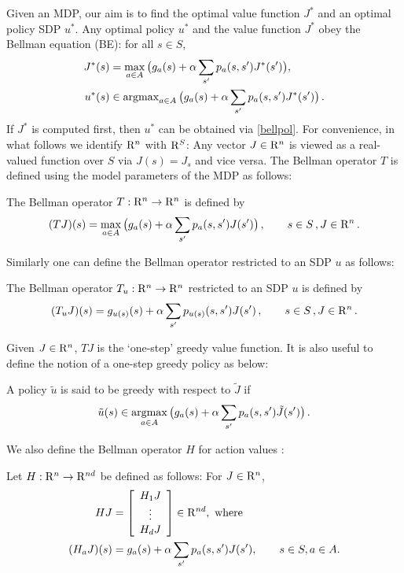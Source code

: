 Given an MDP, our aim is to find the optimal value function $J^*$ and an optimal policy SDP $u^*$. 
Any optimal policy $u^*$ and the value function $J^*$ obey the Bellman equation (BE): for all $ s \in S$, 
\begin{subequations}\label{bell}
\begin{align}
\label{bellval}J^*(s)&=\max_{ a\in A}\big(g_a(s)+\alpha \sum_{s'}p_a(s,s')J^*(s')\big),\\
\label{bellpol}u^*(s)&\in \argmax_{ a\in A}\big(g_a(s)+\alpha \sum_{s'}p_a(s,s')J^*(s')\big)\,.
\end{align}
\end{subequations}
If $J^*$ is computed first, then $u^*$ can be obtained via \eqref{bellpol}. 
For convenience, in what follows we identify $\mathrm{R}^n$ with $\mathrm{R}^{S}$:
Any vector $J\in \mathrm{R}^n$ is viewed as a real-valued function over $S$ via $J(s) = J_s$ and vice versa.
The Bellman operator $T$ is defined using the model parameters of the MDP as follows:
\begin{definition}
The Bellman operator $T: \mathrm{R}^n \to \mathrm{R}^n$ is defined by 
\begin{align}
(TJ)(s)=\max_{a \in A}\big(g_a(s)+\alpha \sum_{s'} p_a(s,s')J(s')\big)\,,  \qquad s\in S\,,J\in \mathrm{R}^n\,.
\end{align}
\end{definition}
Similarly one can define the Bellman operator restricted to an SDP $u$ as follows:
\begin{definition}
The Bellman operator $T_u:\mathrm{R}^n \to \mathrm{R}^n$  restricted to an SDP $u$ is defined by
\begin{align}
(T_uJ)(s)=g_{u(s)}(s)+\alpha \sum_{s'} p_{u(s)}(s,s')J(s')\,,  \qquad s\in S\,,J\in \mathrm{R}^n\,.
\end{align}
\end{definition}
Given $J \in \mathrm{R}^n$, $TJ$ is the `one-step' greedy value function. It is also useful to define the notion of a one-step greedy policy as below:
\begin{definition}
A policy $\tilde{u}$ is said to be greedy with respect to $\tilde{J}$ if
\begin{align}\label{subpol}
\tilde{u}(s)\in \underset{a \in A}{\argmax} \, \big(g_a(s)+\alpha\sum_{s'} p_a(s,s')\tilde{J}(s')\big)\,.
\end{align}
\end{definition}
We also define the Bellman operator $H$ for action values  \cite{BertB}: 
\begin{definition}\label{bellactval}
Let $H: \mathrm{R}^n \to \mathrm{R}^{nd}$ be defined as follows: For $J\in \mathrm{R}^n$,
\begin{align}
HJ&=\left[ {\begin{array}{c} H_1 J  \\ \vdots \\ H_d J\end{array}} \right]\in \mathrm{R}^{nd}, \text{ where}\nonumber\\
(H_a J)(s)&= g_a(s)+\alpha \sum_{s'}p_a(s,s') J(s'), \qquad s\in S, a\in A.
\end{align}
\end{definition}
